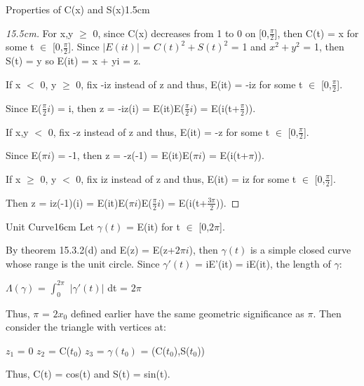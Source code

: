 \begin{ltheorem}{Properties of C(x) and S(x)}{1.5cm}
\begin{proof}[15.5cm]
                For x,y $\geq$ 0, since C(x) decreases from 1 to 0
                on [0,$\frac{\pi}{2}$], then C(t) = x for some
                t $\in$ [0,$\frac{\pi}{2}$].
                Since $|E(it)|$ = $C(t)^2 + S(t)^2$ = 1
                and $x^2 + y^2$ = 1, then S(t) = y so E(it) = x + yi = z.

                \vspace{0.2cm}

                If x $<$ 0, y $\geq$ 0, fix -iz instead of z and thus,
                E(it) = -iz for some t $\in$ [0,$\frac{\pi}{2}$].
                
                Since E($\frac{\pi}{2}i$) = i, then
                z = -iz(i) = E(it)E($\frac{\pi}{2}i$) = E(i(t+$\frac{\pi}{2}$)).

                \vspace{0.2cm}

                If x,y $<$ 0, fix -z instead of z and thus, E(it) = -z
                for some t $\in$ [0,$\frac{\pi}{2}$].

                Since E($\pi i$) = -1, then
                z = -z(-1) = E(it)E($\pi i$) = E(i(t+$\pi$)).

                \vspace{0.2cm}

                If x $\geq$ 0, y $<$ 0, fix iz instead of z and thus,
                E(it) = iz for some t $\in$ [0,$\frac{\pi}{2}$].

                Then z = iz(-1)(i) = E(it)E($\pi i$)E($\frac{\pi}{2}i$)
                = E(i(t+$\frac{3\pi}{2}$)).
            \end{proof}
    \end{ltheorem}

    \vspace{0.5cm}



    \begin{definition}{Unit Curve}{16cm}
        Let $\gamma(t)$ = E(it) for t $\in$ [0,$2\pi$].

        By {\color{red} theorem 15.3.2(d)} and E(z) = E(z+$2\pi i$), then
        $\gamma(t)$ is a simple closed curve whose range is the unit circle.
        Since $\gamma'(t)$ = iE'(it) = iE(it), the length of $\gamma$:

        \hspace{0.5cm}
        $\Lambda(\gamma)$ = $\int_0^{2\pi}$ $|\gamma'(t)|$ dt = $2\pi$

        Thus, $\pi$ = $2x_0$ defined earlier have the same geometric significance
        as $\pi$. Then consider the triangle with vertices at:

        \hspace{0.5cm}
        $z_1$ = 0
        \hspace{1cm}
        $z_2$ = C($t_0$)
        \hspace{1cm}
        $z_3$ = $\gamma(t_0)$ = (C($t_0$),S($t_0$))

        Thus, C(t) = cos(t) and S(t) = sin(t).
    \end{definition}

